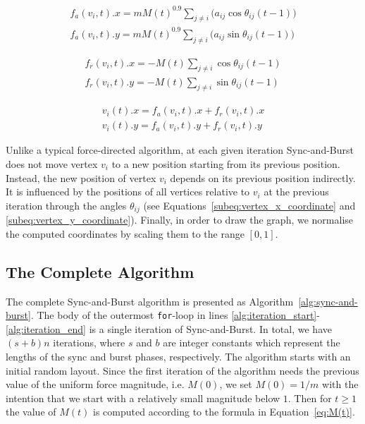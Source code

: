 \documentclass{llncs}
\begin{document}
\begin{subequations}\label{eq:fa_components}
\begin{align}
f_a(v_i, t).x = mM(t)^{0.9}\sum_{j \neq i}\big(a_{ij}\cos{\theta_{ij}(t-1)}\big)\label{subeq:fa_x_component}\\
f_a(v_i, t).y = mM(t)^{0.9}\sum_{j \neq i}\big(a_{ij}\sin{\theta_{ij}(t-1)}\big)\label{subeq:fa_y_component}
\end{align}
\end{subequations}

\begin{subequations}\label{eq:fr_components}
\begin{align}
f_r(v_i, t).x = -M(t)\sum_{j \neq i}\cos{\theta_{ij}(t-1)}\label{subeq:fr_x_component}\\
f_r(v_i, t).y = -M(t)\sum_{j \neq i}\sin{\theta_{ij}(t-1)}\label{subeq:fr_y_component}
\end{align}
\end{subequations}

\begin{subequations}\label{eq:vertex_coordinates}
\begin{align}
v_{i}(t).x = f_a(v_i, t).x + f_r(v_i, t).x\label{subeq:vertex_x_coordinate}\\
v_{i}(t).y = f_a(v_i, t).y + f_r(v_i, t).y\label{subeq:vertex_y_coordinate}
\end{align}
\end{subequations}

Unlike a typical force-directed algorithm, at each given iteration Sync-and-Burst does not move vertex $v_i$ to a new position starting from its previous position. Instead, the new position of vertex $v_i$ depends on its previous position indirectly. It is influenced by the positions of all vertices relative to $v_i$ at the previous iteration through the angles $\theta_{ij}$ (see Equations~\eqref{subeq:vertex_x_coordinate} and \eqref{subeq:vertex_y_coordinate}). Finally, in order to draw the graph, we normalise the computed coordinates by scaling them to the range $[0, 1]$.

\subsection{The Complete Algorithm} \label{sec:pseudocode}

The complete Sync-and-Burst algorithm is presented as Algorithm~\ref{alg:sync-and-burst}. The body of the outermost \texttt{for}-loop in lines \ref{alg:iteration_start}-\ref{alg:iteration_end} is a single iteration of Sync-and-Burst. In total, we have $(s+b)n$ iterations, where $s$ and $b$ are integer constants which represent the lengths of the sync and burst phases, respectively. The algorithm starts with an initial random layout. Since the first iteration of the algorithm needs the previous value of the uniform force magnitude, i.e. $M(0)$, we set $M(0) = 1/m$ with the intention that we start with a relatively small magnitude below $1$. Then for $t \ge 1$ the value of $M(t)$ is computed according to the formula in Equation~\eqref{eq:M(t)}.
\end{document}
